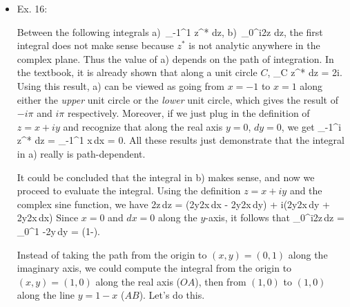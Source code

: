 \documentclass[10pt, letterpaper]{article}
\begin{document}
\begin{itemize}
\begin{enumerate}
		\item $\log(e^z) = z + 2\pi ni$

		Write $z=re^{i\theta}$, we have
		\be
			e^z = e^{re^{i\theta}} = _{R}\cdot e^{i^\phi} 
			    \equiv R\cdot e^{i\phi} \nonumber
		\ee
		With this identity, we can proceed to show that
		\be
			\log(e^z) = \log(R\cdot e^{i\phi}) = \log R + i\phi + 2\pi ni = r\cos\theta + ir\sin\theta + 2\pi ni = z + 2\pi ni.
			\nonumber
		\ee

	\end{enumerate}

	\item Ex. 16:

	Between the following integrals
	\be
		\mbox{a)}\,\,\,\int_{-1}^1 z^* dz,\hspace{1.5cm}
		\mbox{b)}\,\,\,\int_0^i\sin 2z dz, \nonumber
	\ee
	the first integral does not make sense because $z^*$ is not analytic anywhere in the complex plane. Thus the value of
	a) depends on the path of integration. In the textbook, it is already shown that along a unit circle $C$,
	\be
		\oint_C z^* dz = 2\pi i. \nonumber
	\ee
	Using this result, a) can be viewed as going from $x=-1$ to $x=1$ along either the {\it upper} unit circle or 
	the {\it lower} unit circle, which gives the result of $-i\pi$ and $i\pi$ respectively. Moreover, if we just plug in
	the definition of $z=x+iy$ and recognize that along the real axis $y=0$, $dy=0$, we get
	\be
		\int_{-1}^i z^* dz = \int_{-1}^1 x\,dx = 0. \nonumber
	\ee
	All these results just demonstrate that the integral in a) really is path-dependent.

	It could be concluded that the integral in b) makes sense, and now we proceed to evaluate the integral.
	Using the definition $z=x+iy$ and the complex sine function, we have
	\be
		\sin 2z\,dz = (\cosh 2y\sin 2x\,dx - \sinh 2y\cos 2x\,dy) + i(\cosh 2y\sin 2x\,dy + \sinh 2y\cos 2x\,dx) 
		\label{eq:ex16integrand}
	\ee
	Since $x=0$ and $dx=0$ along the $y$-axis, it follows that
	\be
		\int_0^i\sin 2z\,dz = \int_0^1 -\sinh 2y\,dy = (1-\cosh 2). 
		\label{ex16:direct_integral}
	\ee

	Instead of taking the path from the origin to $(x,y)=(0,1)$ along the imaginary axis, we could compute the integral
	from the origin to $(x,y)=(1,0)$ along the real axis ($OA$), then from $(1,0)$ to $(1,0)$ along the line $y=1-x$ ($AB$).
	Let's do this.


\end{itemize}
\end{document}
